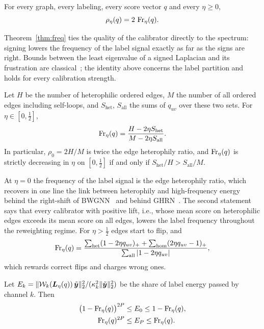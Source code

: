 \begin{theorem}\label{thm:freq}
For every graph, every labeling, every score vector $q$ and every $\eta\ge0$,
\[
\rho_\eta(q)=2\,\operatorname{Fr}_\eta(q).
\]
\end{theorem}

Theorem~\ref{thm:freq} ties the quality of the calibrator directly to the spectrum: signing lowers the frequency of the label signal exactly as far as the signs are right.
Bounds between the least eigenvalue of a signed Laplacian and its frustration are classical~\citep{Belardo2014,AtayLiu2020}; the identity above concerns the label partition and holds for every calibration strength.

\begin{corollary}\label{cor:lift}
Let $H$ be the number of heterophilic ordered edges, $M$ the number of all ordered edges including self-loops, and $S_{\mathrm{het}}$, $S_{\mathrm{all}}$ the sums of $q_{uv}$ over these two sets.
For $\eta\in[0,\tfrac12]$,
\[
\operatorname{Fr}_\eta(q)=\frac{H-2\eta S_{\mathrm{het}}}{M-2\eta S_{\mathrm{all}}}.
\]
In particular, $\rho_0=2H/M$ is twice the edge heterophily ratio, and $\operatorname{Fr}_\eta(q)$ is strictly decreasing in $\eta$ on $[0,\tfrac12]$ if and only if $S_{\mathrm{het}}/H>S_{\mathrm{all}}/M$.
\end{corollary}

At $\eta=0$ the frequency of the label signal is the edge heterophily ratio, which recovers in one line the link between heterophily and high-frequency energy behind the right-shift of BWGNN~\citep{BWGNN} and behind GHRN~\citep{GHRN}.
The second statement says that every calibrator with positive lift, i.e., whose mean score on heterophilic edges exceeds its mean score on all edges, lowers the label frequency throughout the reweighting regime.
For $\eta>\tfrac12$ edges start to flip, and
\[
\operatorname{Fr}_\eta(q)=\frac{\sum_{\mathrm{het}}(1-2\eta q_{uv})_+ +\sum_{\mathrm{hom}}(2\eta q_{uv}-1)_+}{\sum_{\mathrm{all}}|1-2\eta q_{uv}|},
\]
which rewards correct flips and charges wrong ones.

\begin{corollary}\label{cor:energy}
Let $E_k=\|\mathcal{W}_k(\bm L_\eta(q))\,\tilde{\bm{y}}\|_2^2/(\kappa_k^2\|\tilde{\bm{y}}\|_2^2)$ be the share of label energy passed by channel $k$. Then
\begin{align*}
\bigl(1-\operatorname{Fr}_\eta(q)\bigr)^{2P}&\le E_0\le 1-\operatorname{Fr}_\eta(q),\\
\operatorname{Fr}_\eta(q)^{2P}&\le E_P\le\operatorname{Fr}_\eta(q).
\end{align*}
\end{corollary}

